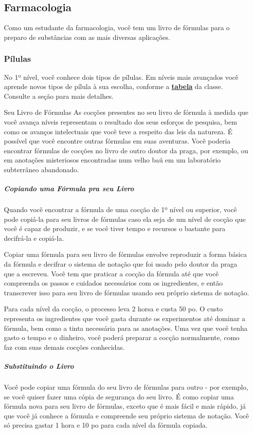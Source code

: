 \documentclass[letterpaper,twocolumn,openany]{dndbook}
\begin{document}
	\subsection{Farmacologia}
	Como um estudante da farmacologia, você tem um livro de fórmulas para o preparo de substâncias com as mais diversas aplicações.
	
	\subsubsection{Pílulas}
	No 1º nível, você conhece dois tipos de pílulas. Em níveis mais avançados você aprende novos tipos de pílula à sua escolha, conforme a \hyperref[tab:doutor_da_praga]{\textbf{tabela}} da classe. Consulte a seção \textbf{} para mais detalhes.
	
	\begin{paperbox}[float=!b]{Seu Livro de Fórmulas}
		As cocções presentes no seu livro de fórmula à medida que você avança níveis representam o resultado dos seus esforços de pesquisa, bem como os avanços intelectuais que você teve a respeito das leis da natureza. É possível que você encontre outras fórmulas em suas aventuras. Você poderia encontrar fórmulas de cocções no livro de outro doutor da praga, por exemplo, ou em anotações misteriosos encontradas num velho baú em um laboratório subterrâneo abandonado.
		\subparagraph{Copiando uma Fórmula pra seu Livro} Quando você encontrar a fórmula de uma cocção de 1º nível ou superior, você pode copiá-la para seu livros de fórmulas caso ela seja de um nível de cocção que você é capaz de produzir, e se você tiver tempo e recursos o bastante para decifrá-la e copiá-la.
		\par Copiar uma fórmula para seu livro de fórmulas envolve reproduzir a forma básica da fórmula e decifrar o sistema de notação que foi usado pelo doutor da praga que a escreveu. Você tem que praticar a cocção da fórmula até que você compreenda os passos e cuidados necessários com os ingredientes, e então transcrever isso para seu livro de fórmulas usando seu próprio sistema de notação.
		\par Para cada nível da cocção, o processo leva 2 horsa e custa 50 po. O custo representa os ingredientes que você gasta durante os experimentos até dominar a fórmula, bem como a tinta necessária para as anotações. Uma vez que você tenha gasto o tempo e o dinheiro, você poderá preparar a cocção normalmente, como faz com suas demais cocções conhecidas.
		\subparagraph{Substituindo o Livro}
		Você pode copiar uma fórmula do seu livro de fórmulas para outro - por exemplo, se você quiser fazer uma cópia de segurança do seu livro. É como copiar uma fórmula nova para seu livro de fórmulas, exceto que é mais fácil e mais rápido, já que você já conhece a fórmula e compreende seu próprio sistema de notação. Você só precisa gastar 1 hora e 10 po para cada nível da fórmula copiada.

\end{paperbox}
\end{document}
